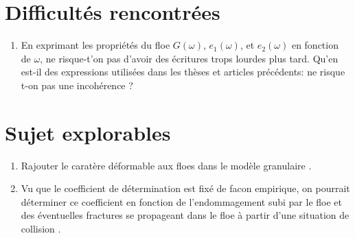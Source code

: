 \documentclass[
  french,
	11pt, %
]{fphw}
\begin{document}

\section{Difficultés rencontrées}

\begin{enumerate}
  \item En exprimant les propriétés du floe $G(\omega)$, $e_1(\omega)$, et $e_2(\omega)$ en fonction de $\omega$, ne risque-t'on pas d'avoir des écritures trops lourdes plus tard. Qu'en est-il des expressions utilisées dans les thèses et articles précédents: ne risque t-on pas une incohérence ? 
\end{enumerate}






\section{Sujet explorables}

\begin{enumerate}
  \item Rajouter le caratère déformable aux floes dans le modèle granulaire \parencite[p.12]{rabatel2015thesis}.
  \item Vu que le coefficient de détermination est fixé de facon empirique, on pourrait déterminer ce coefficient en fonction de l’endommagement subi par le floe et des éventuelles fractures se propageant dans le floe à partir d’une situation de collision \parencite[p.14]{rabatel2015thesis}.
  
\end{enumerate}

\clearpage   %
\printbibliography
\end{document}
